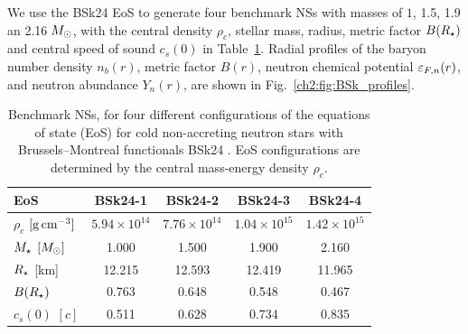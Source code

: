We use the BSk24 EoS to generate four benchmark NSs with masses of $1$, 1.5, 1.9 an 2.16$\;M_\odot$, with the central density $\rho_c$, stellar mass, radius, metric factor $B(R_\star)$ and central speed of sound $c_s(0)$ in Table~\ref{ch2:tab:BSk_configs}. 
Radial profiles of the baryon number density $n_b(r)$, metric factor $B(r)$, neutron chemical potential $\varepsilon_{F,n}(r)$, and neutron abundance  $Y_n(r)$, are shown in Fig.~\ref{ch2:fig:BSk_profiles}. 



\begin{table}[tb]
    \centering
    \begin{tabular}{l c c c c}
    \toprule
     EoS &  BSk24-1 &  BSk24-2 &  BSk24-3 &  BSk24-4 \\ \midrule\midrule
    $\rho_c$ $[\rm{g \, cm^{-3}}]$ & $5.94 \times 10^{14}$   & $7.76 \times 10^{14}$ & $1.04 \times 10^{15}$ & $1.42 \times 10^{15}$  \\
    $M_\star$ $[M_\odot]$ & 1.000 & 1.500 & 1.900 & 2.160  \\
    $R_\star$ [km] & 12.215  & 12.593 & 12.419 & 11.965 \\
    $B(R_\star)$ & 0.763 & 0.648 & 0.548 & 0.467\\
    $c_s(0)$ $[c]$ & 0.511 & 0.628 & 0.734 & 0.835 \\
    \bottomrule
    \end{tabular} 
    \caption[Benchmark NSs, for four different configurations of the equations of state (EoS) for cold non-accreting neutron stars with Brussels–Montreal functionals BSk24 \cite{Pearson:2018tkr_Unifiedequationsstate}.]{Benchmark NSs, for four different configurations of the equations of state (EoS) for cold non-accreting neutron stars with Brussels–Montreal functionals BSk24 \cite{Pearson:2018tkr_Unifiedequationsstate}. EoS configurations are determined by the central mass-energy density $\rho_c$.}
    \label{ch2:tab:BSk_configs}
\end{table} 

